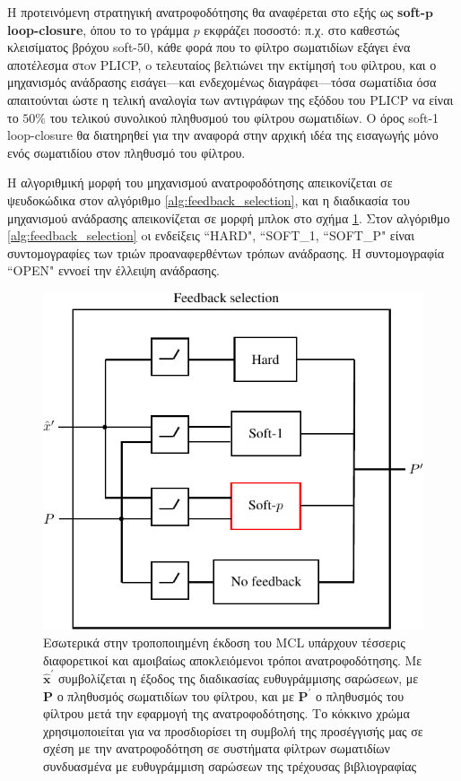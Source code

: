Η προτεινόμενη στρατηγική ανατροφοδότησης θα αναφέρεται στο εξής ως
\textbf{soft-}$\bm{p}$ \textbf{loop-closure}, όπου το το γράμμα $p$ εκφράζει
ποσοστό: π.χ. στο καθεστώς κλεισίματος βρόχου soft-$50$, κάθε φορά που το
φίλτρο σωματιδίων εξάγει ένα αποτέλεσμα στoν PLICP, o τελευταίος βελτιώνει την
εκτίμησή τoυ φίλτρου, και ο μηχανισμός ανάδρασης εισάγει---και ενδεχομένως
διαγράφει---τόσα σωματίδια όσα απαιτούνται ώστε η τελική αναλογία των
αντιγράφων της εξόδου του PLICP να είναι το $50\%$ του τελικού συνολικού
πληθυσμού του φίλτρου σωματιδίων. Ο όρος soft-1 loop-closure θα διατηρηθεί για
την αναφορά στην αρχική ιδέα της εισαγωγής μόνο ενός σωματιδίου στον πληθυσμό
του φίλτρου.

Η αλγοριθμική μορφή του μηχανισμού ανατροφοδότησης απεικονίζεται σε ψευδοκώδικα
στον αλγόριθμο \ref{alg:feedback_selection}, και η διαδικασία του μηχανισμού
ανάδρασης απεικονίζεται σε μορφή μπλοκ στο σχήμα \ref{fig:feedback}.  Στον
αλγόριθμο \ref{alg:feedback_selection} oι ενδείξεις ``HARD", ``SOFT\_1,
``SOFT\_P" είναι συντομογραφίες των τριών προαναφερθέντων τρόπων ανάδρασης. Η
συντομογραφία ``OPEN" εννοεί την έλλειψη ανάδρασης.


\begin{figure}\centering
  \includegraphics{./figures/parts/02/chapters/02/sections/03/feedback}
  \caption{\small Εσωτερικά στην τροποποιημένη έκδοση του MCL υπάρχουν τέσσερις
           διαφορετικοί και αμοιβαίως αποκλειόμενοι τρόποι ανατροφοδότησης. Με
           $\hat{\bm{x}}^{\prime}$ συμβολίζεται η έξοδος της διαδικασίας
           ευθυγράμμισης σαρώσεων, με $\bm{P}$ ο πληθυσμός σωματιδίων του
           φίλτρου, και με $\bm{P}^{\prime}$ ο πληθυσμός του φίλτρου μετά την
           εφαρμογή της ανατροφοδότησης. Το κόκκινο χρώμα χρησιμοποιείται για να
           προσδιορίσει τη συμβολή της προσέγγισής μας σε σχέση με την
           ανατροφοδότηση σε συστήματα φίλτρων σωματιδίων συνδυασμένα με
           ευθυγράμμιση σαρώσεων της τρέχουσας βιβλιογραφίας}
  \label{fig:feedback}
\end{figure}

